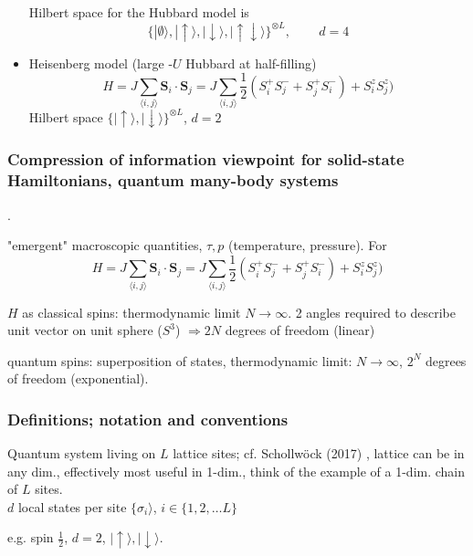\documentclass[10pt]{amsart}
\begin{document}
\begin{multicols*}{2}
\begin{itemize}
	Hilbert space for the Hubbard model is 
	\begin{equation}
	\lbrace | \emptyset \rangle , | \uparrow \rangle , | \downarrow \rangle , | \uparrow \downarrow \rangle \rbrace^{ \otimes L}, \qquad \, d = 4
	\end{equation}
	\item Heisenberg model (large -$U$ Hubbard at half-filling)
	\begin{equation}
	H = J \sum_{ \langle i , j \rangle } \mathbf{S}_i \cdot \mathbf{S}_j = J \sum_{ \langle i, j \rangle } \frac{1}{2} (S_i^{+} S_j^- + S_j^{+} S_i^-) + S_i^z S_j^z  )
	\end{equation}
	Hilbert space $\lbrace | \uparrow \rangle, | \downarrow \rangle \rbrace^{\otimes L}$, $d=2$ 
\end{itemize}

\subsubsection{Compression of information viewpoint for solid-state Hamiltonians, quantum many-body systems}.

"emergent" macroscopic quantities, $\tau, p$ (temperature, pressure). For 
\[
	H = J \sum_{ \langle i , j \rangle } \mathbf{S}_i \cdot \mathbf{S}_j = J \sum_{ \langle i, j \rangle } \frac{1}{2} (S_i^{+} S_j^- + S_j^{+} S_i^-) + S_i^z S_j^z  )
\]

$H$ as classical spins: thermodynamic limit $N \to \infty$. 2 angles required to describe unit vector on unit sphere ($S^3$) $\Longrightarrow 2N $ degrees of freedom (linear)

quantum spins: superposition of states, thermodynamic limit: $N \to \infty$, $2^N$ degrees of freedom (exponential).

\subsubsection{Definitions; notation and conventions}

Quantum system living on $L$ lattice sites; cf. Schollw\"{o}ck (2017) \cite{ArSo2017}, lattice can be in any dim., effectively most useful in 1-dim., think of the example of a 1-dim. chain of $L$ sites. \\

$d$ local states per site $\lbrace \sigma_i \rangle$, $i \in \lbrace 1,2, \dots L\rbrace$

e.g. spin $\frac{1}{2}$, $d=2$, $| \uparrow \rangle, | \downarrow \rangle$.


\end{multicols*}
\end{document}
